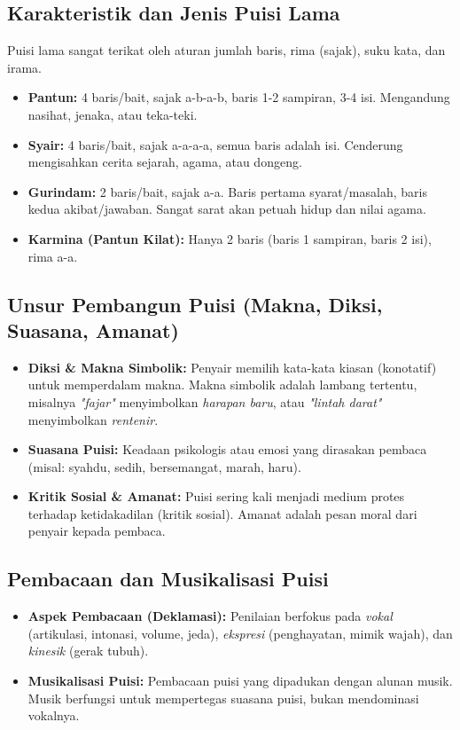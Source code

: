 \documentclass[12pt, a4paper]{article}
\begin{document}
\subsection{Karakteristik dan Jenis Puisi Lama}
Puisi lama sangat terikat oleh aturan jumlah baris, rima (sajak), suku kata, dan irama.
\begin{itemize}
    \item \textbf{Pantun:} 4 baris/bait, sajak a-b-a-b, baris 1-2 sampiran, 3-4 isi. Mengandung nasihat, jenaka, atau teka-teki.
    \item \textbf{Syair:} 4 baris/bait, sajak a-a-a-a, semua baris adalah isi. Cenderung mengisahkan cerita sejarah, agama, atau dongeng.
    \item \textbf{Gurindam:} 2 baris/bait, sajak a-a. Baris pertama syarat/masalah, baris kedua akibat/jawaban. Sangat sarat akan petuah hidup dan nilai agama.
    \item \textbf{Karmina (Pantun Kilat):} Hanya 2 baris (baris 1 sampiran, baris 2 isi), rima a-a.
\end{itemize}

\subsection{Unsur Pembangun Puisi (Makna, Diksi, Suasana, Amanat)}
\begin{itemize}
    \item \textbf{Diksi \& Makna Simbolik:} Penyair memilih kata-kata kiasan (konotatif) untuk memperdalam makna. Makna simbolik adalah lambang tertentu, misalnya \textit{"fajar"} menyimbolkan \textit{harapan baru}, atau \textit{"lintah darat"} menyimbolkan \textit{rentenir}.
    \item \textbf{Suasana Puisi:} Keadaan psikologis atau emosi yang dirasakan pembaca (misal: syahdu, sedih, bersemangat, marah, haru).
    \item \textbf{Kritik Sosial \& Amanat:} Puisi sering kali menjadi medium protes terhadap ketidakadilan (kritik sosial). Amanat adalah pesan moral dari penyair kepada pembaca.
\end{itemize}

\subsection{Pembacaan dan Musikalisasi Puisi}
\begin{itemize}
    \item \textbf{Aspek Pembacaan (Deklamasi):} Penilaian berfokus pada \textit{vokal} (artikulasi, intonasi, volume, jeda), \textit{ekspresi} (penghayatan, mimik wajah), dan \textit{kinesik} (gerak tubuh).
    \item \textbf{Musikalisasi Puisi:} Pembacaan puisi yang dipadukan dengan alunan musik. Musik berfungsi untuk mempertegas suasana puisi, bukan mendominasi vokalnya.
\end{itemize}
\end{document}
